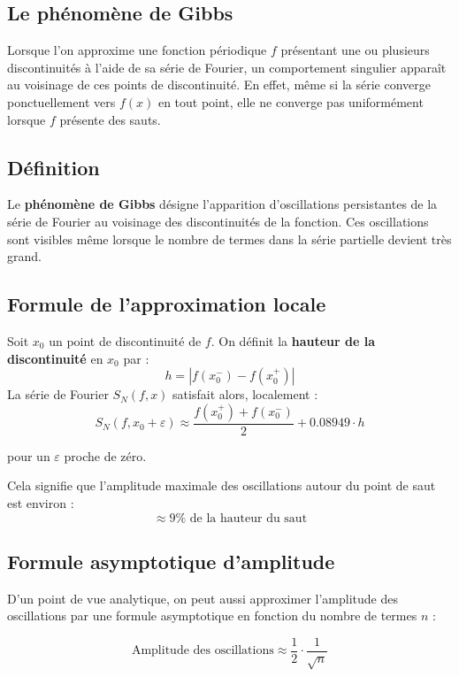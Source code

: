 \documentclass[11pt]{article} %
\begin{document}
\begin{large}
\section{Le phénomène de Gibbs}

Lorsque l’on approxime une fonction périodique $f$ présentant une ou plusieurs discontinuités à l’aide de sa série de Fourier, un comportement singulier apparaît au voisinage de ces points de discontinuité. En effet, même si la série converge ponctuellement vers $f(x)$ en tout point, elle ne converge pas uniformément lorsque $f$ présente des sauts.

\subsection{Définition}

Le \textbf{phénomène de Gibbs} désigne l’apparition d’oscillations persistantes de la série de Fourier au voisinage des discontinuités de la fonction. Ces oscillations sont visibles même lorsque le nombre de termes dans la série partielle devient très grand.



\subsection{Formule de l’approximation locale}

Soit $x_0$ un point de discontinuité de $f$. On définit la \textbf{hauteur de la discontinuité} en \( x_0 \) par :
\[
h = \left| f(x_0^-) - f(x_0^+) \right|
\]
La série de Fourier \( S_N(f,x) \) satisfait alors, localement :
\[
S_N(f, x_0 + \varepsilon) \approx \frac{f(x_0^+) + f(x_0^-)}{2} + 0.08949 \cdot h
\]


pour un $\varepsilon$ proche de zéro.

Cela signifie que l’amplitude maximale des oscillations autour du point de saut est environ :
\[
\boxed{ \approx 9\% \text{ de la hauteur du saut} }
\]

\subsection{Formule asymptotique d’amplitude}

D’un point de vue analytique, on peut aussi approximer l’amplitude des oscillations par une formule asymptotique en fonction du nombre de termes $n$ :

\[
\text{Amplitude des oscillations} \approx \frac{1}{2} \cdot \frac{1}{\sqrt{n}}
\]


\end{large}
\end{document}
